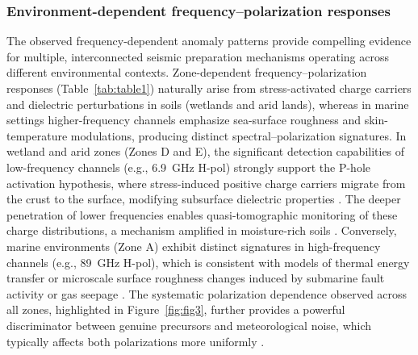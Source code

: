 \documentclass[preprint,review,12pt,authoryear]{elsarticle}
\begin{document}
\subsubsection{Environment-dependent frequency--polarization responses}
The observed frequency-dependent anomaly patterns provide compelling evidence for multiple, interconnected seismic preparation mechanisms operating across different environmental contexts. Zone-dependent frequency--polarization responses (Table~\ref{tab:table1}) naturally arise from stress-activated charge carriers and dielectric perturbations in soils (wetlands and arid lands), whereas in marine settings higher-frequency channels emphasize sea-surface roughness and skin-temperature modulations, producing distinct spectral--polarization signatures. In wetland and arid zones (Zones D and E), the significant detection capabilities of low-frequency channels (e.g., 6.9~GHz H-pol) strongly support the P-hole activation hypothesis, where stress-induced positive charge carriers migrate from the crust to the surface, modifying subsurface dielectric properties \citep{freundPreearthquakeSignalsUnderlying2011,maoImpactCompressiveStress2020}. The deeper penetration of lower frequencies enables quasi-tomographic monitoring of these charge distributions, a mechanism amplified in moisture-rich soils \citep{jingChangesSurfaceWater2022}. Conversely, marine environments (Zone A) exhibit distinct signatures in high-frequency channels (e.g., 89~GHz H-pol), which is consistent with models of thermal energy transfer or microscale surface roughness changes induced by submarine fault activity or gas seepage \citep{liuGeneralFeaturesMultiparameter2023}. The systematic polarization dependence observed across all zones, highlighted in Figure~\ref{fig:fig3}, further provides a powerful discriminator between genuine precursors and meteorological noise, which typically affects both polarizations more uniformly \citep{lixinProgressesPossibleFrontiers2022}.
\end{document}
